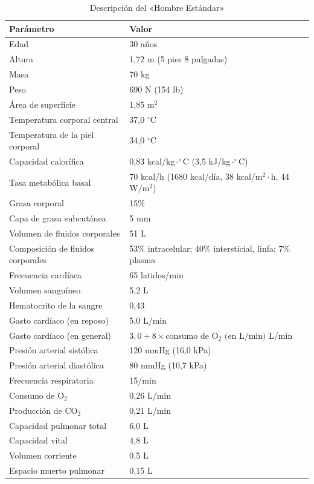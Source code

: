 \documentclass[12pt]{book}
\begin{document}
\begin{table}[htbp]
\centering
\caption{Descripción del «Hombre Estándar»}
\label{tab:15}
\begin{tabularx}{0.8\textwidth}{lX}
\toprule
\textbf{Parámetro} & \textbf{Valor} \\
\midrule
Edad & 30 años \\
Altura & 1,72 m (5 pies 8 pulgadas) \\
Masa & 70 kg \\
Peso & 690 N (154 lb) \\
Área de superficie & 1,85 $\text{m}^2$ \\
Temperatura corporal central & 37,0 $^\circ$C \\
Temperatura de la piel corporal & 34,0 $^\circ$C \\
Capacidad calorífica & 0,83 kcal/kg$\cdot^\circ$C (3,5 kJ/kg$\cdot^\circ$C) \\
Tasa metabólica basal & 70 kcal/h (1680 kcal/día, 38 kcal/$\text{m}^2\cdot$h, 44 W/$\text{m}^2$) \\
Grasa corporal & 15\% \\
Capa de grasa subcutánea & 5 mm \\
Volumen de fluidos corporales & 51 L \\
Composición de fluidos corporales & 53\% intracelular; 40\% intersticial, linfa; 7\% plasma \\
Frecuencia cardíaca & 65 latidos/min \\
Volumen sanguíneo & 5,2 L \\
Hematocrito de la sangre & 0,43 \\
Gasto cardíaco (en reposo) & 5,0 L/min \\
Gasto cardíaco (en general) & $3,0 + 8 \times \text{consumo de } \text{O}_2 \text{ (en L/min)}$ L/min \\
Presión arterial sistólica & 120 mmHg (16,0 kPa) \\
Presión arterial diastólica & 80 mmHg (10,7 kPa) \\
Frecuencia respiratoria & 15/min \\
Consumo de $\text{O}_2$ & 0,26 L/min \\
Producción de $\text{CO}_2$ & 0,21 L/min \\
Capacidad pulmonar total & 6,0 L \\
Capacidad vital & 4,8 L \\
Volumen corriente & 0,5 L \\
Espacio muerto pulmonar & 0,15 L \\

\end{tabularx}
\end{table}
\end{document}

